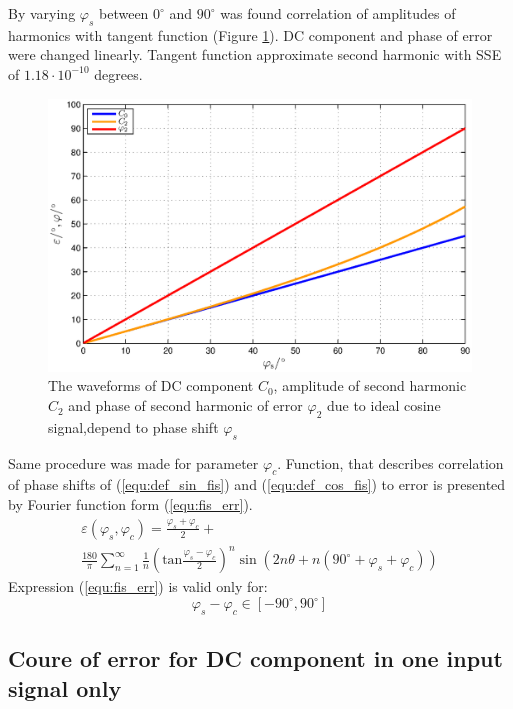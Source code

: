 \documentclass[a4paper]{article}
\begin{document}
By varying $\varphi_s$ between $0^\circ$ and $90^\circ$ was found correlation of amplitudes of harmonics with tangent function (Figure \ref{fig:fis}). DC component and phase of error were changed linearly. Tangent function approximate second harmonic with SSE of $1.18 \cdot 10^{-10}$ degrees.
\begin{figure}[!htb]
	\begin{center}
		\includegraphics[width=\linewidth]{./Slike/fis.eps}
		\caption{The waveforms of DC component $C_0$, amplitude of second harmonic  $C_2$ and phase of second harmonic of  error $\varphi_2$ due to ideal cosine signal,depend to phase shift $\varphi_{s}$} \label{fig:fis}
	\end{center}
\end{figure}

Same procedure was made for parameter $\varphi_c$. Function, that describes correlation of phase shifts of (\ref{equ:def_sin_fis}) and (\ref{equ:def_cos_fis}) to error is presented by Fourier function form (\ref{equ:fis_err}).
\begin{multline}
\label{equ:fis_err}
\varepsilon(\varphi_{s},\varphi_{c}) = \frac{\varphi_{s}+\varphi_{c}}{2}+\\ \frac{180}{\pi}\sum_{n=1}^{\infty}\frac{1}{n} (\mathrm{tan}\frac{\varphi_{s}-\varphi_{c}}{2})^n \sin (2n \theta+n(90^\circ +\varphi_{s}+\varphi_{c}))
\end{multline}
Expression (\ref{equ:fis_err}) is valid only for:
$$ \varphi_{s}-\varphi_{c} \in [ -90^\circ , 90^\circ ] $$

\subsection{Coure of error for DC component in one input signal only}
\end{document}

